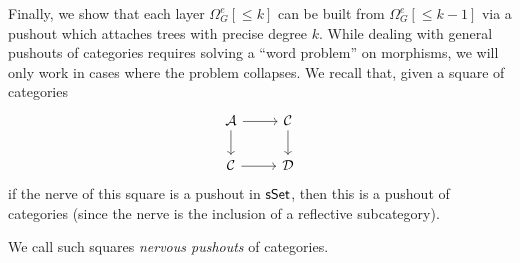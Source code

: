 \documentclass[a4paper,10pt]{article}%
\begin{document}

Finally, we show that each layer $\Omega_G^e[\leq k]$ can be built from $\Omega_{G}^e[\leq k-1]$ via a pushout which attaches trees with precise degree $k$. 
While dealing with general pushouts of categories requires solving a ``word problem'' on morphisms, we will only work in cases where the problem collapses. We recall that, given a square of categories
\[
\begin{tikzcd}
  \mathcal A \arrow[d] \arrow[r] & \mathcal C \arrow[d]\\
  \mathcal C \arrow[r] & \mathcal D
\end{tikzcd}
\]
if the nerve of this square is a pushout in $\mathsf{sSet}$, then this is a pushout of categories (since the nerve is the inclusion of a reflective subcategory).
\begin{definition}
  \label{NERVOUS_PUSHOUTS_DEFN}
  We call such squares \textit{nervous pushouts} of categories.
\end{definition}
\end{document}
